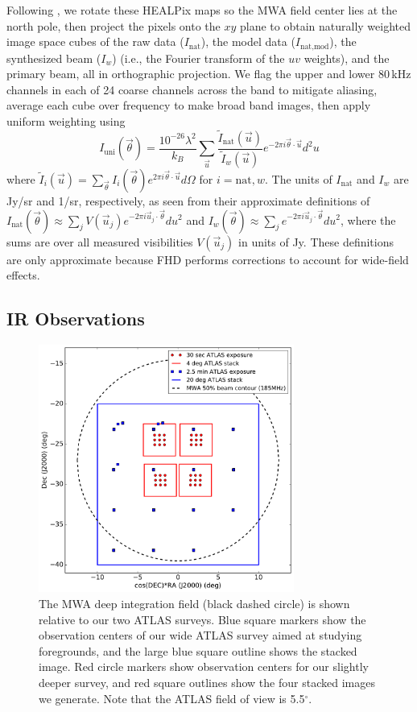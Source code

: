 \documentclass[numberedappendix]{emulateapj}
\begin{document}
Following \citet{dillonneben}, we rotate these HEALPix maps so the MWA field center lies at the north pole, then project the pixels onto the $xy$ plane to obtain naturally weighted image space cubes of the raw data ($I_\text{nat}$), the model data ($I_\text{nat,mod}$), the synthesized beam ($I_w$) (i.e., the Fourier transform of the $uv$ weights), and the primary beam, all in orthographic projection. We flag the upper and lower 80\,kHz channels in each of 24 coarse channels across the band to mitigate aliasing, average each cube over frequency to make broad band images, then apply uniform weighting using
\begin{equation}
\label{eqn:uniformweighting}
I_\text{uni}(\vec{\theta}) = \frac{10^{-26}\lambda^2}{k_B } \sum_{\vec{u}} \frac{\tilde{I}_\text{nat}(\vec{u})}{\tilde{I}_w(\vec{u})} e^{-2\pi i \vec{\theta}\cdot\vec{u}}d^2u
\end{equation}
where $\tilde{I}_i(\vec{u}) = \sum_{\vec{\theta}} I_i(\vec{\theta}) e^{2\pi i\vec{\theta}\cdot\vec{u}} d\Omega$ for $i=\text{nat},w$. The units of $I_\text{nat}$ and $I_w$ are Jy/sr and 1/sr, respectively, as seen from their approximate definitions of $I_\text{nat}(\vec{\theta})\approx\sum_j V(\vec{u}_j)e^{-2\pi i\vec{u}_j\cdot\vec{\theta}}du^2$ and $I_w(\vec{\theta})\approx\sum_j e^{-2\pi i\vec{u}_j\cdot\vec{\theta}}du^2$, where the sums are over all measured visibilities $V(\vec{u}_j)$ in units of Jy. These definitions are only approximate because FHD performs corrections to account for wide-field effects.

\subsection{IR Observations}

\begin{figure}[h]
\centering
\includegraphics[width=3.3in]{survey_overview.pdf}
\caption[Diagram of the MWA deep integration field and our ATLAS surveys.]{The MWA deep integration field (black dashed circle) is shown relative to our two ATLAS surveys. Blue square markers show the observation centers of our wide ATLAS survey aimed at studying foregrounds, and the large blue square outline shows the stacked image. Red circle markers show observation centers for our slightly deeper survey, and red square outlines show the four stacked images we generate. Note that the ATLAS field of view is 5.5$^\circ$.}
\label{fig:surveyoverview}
\end{figure}
\end{document}

